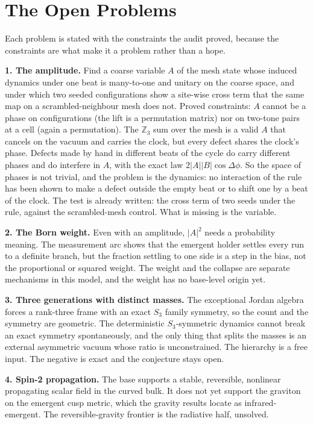 \section{The Open Problems}

Each problem is stated with the constraints the audit proved, because the constraints are what make it a problem
rather than a hope.

\textbf{1. The amplitude.} Find a coarse variable $A$ of the mesh state whose induced dynamics under one beat is
many-to-one and unitary on the coarse space, and under which two seeded configurations show a site-wise cross term
that the same map on a scrambled-neighbour mesh does not. Proved constraints: $A$ cannot be a phase on configurations
(the lift is a permutation matrix) nor on two-tone pairs at a cell (again a permutation). The $\mathbb{Z}_3$ sum over
the mesh is a valid $A$ that cancels on the vacuum and carries the clock, but every defect shares the clock's phase.
Defects made by hand in different beats of the cycle do carry different phases and do interfere in $A$, with the
exact law $2|A||B|\cos\Delta\phi$. So the space of phases is not trivial, and the problem is the dynamics: no
interaction of the rule has been shown to make a defect outside the empty beat or to shift one by a beat of the
clock. The test is
already written: the cross term of two seeds under the rule, against the scrambled-mesh control. What is missing is
the variable.

\textbf{2. The Born weight.} Even with an amplitude, $|A|^2$ needs a probability meaning. The measurement arc shows
that the emergent holder settles every run to a definite branch, but the fraction settling to one side is a step in
the bias, not the proportional or squared weight. The weight and the collapse are separate mechanisms in this model,
and the weight has no base-level origin yet.

\textbf{3. Three generations with distinct masses.} The exceptional Jordan algebra forces a rank-three frame with an
exact $S_3$ family symmetry, so the count and the symmetry are geometric. The deterministic $S_3$-symmetric dynamics
cannot break an exact symmetry spontaneously, and the only thing that splits the masses is an external asymmetric
vacuum whose ratio is unconstrained. The hierarchy is a free input. The negative is exact and the conjecture stays
open.

\textbf{4. Spin-2 propagation.} The base supports a stable, reversible, nonlinear propagating scalar field in the
curved bulk. It does not yet support the graviton on the emergent cusp metric, which the gravity results locate as
infrared-emergent. The reversible-gravity frontier is the radiative half, unsolved.

